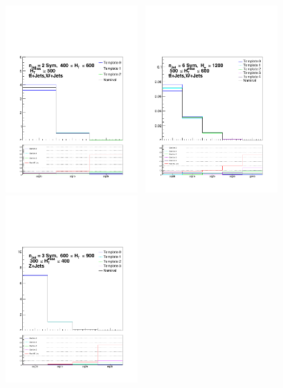 \begin{figure}[h!]
  \centering
  \includegraphics[width=0.45\textwidth]{figures/btagformula/uncertainties/Ttw_eq2j_400600_500Inc}~
  \includegraphics[width=0.45\textwidth]{figures/btagformula/uncertainties/Ttw_ge6j_1200Inc_500600} \\
  \includegraphics[width=0.45\textwidth]{figures/btagformula/uncertainties/Zinv_eq3j_600900_300400}~

\end{figure}
